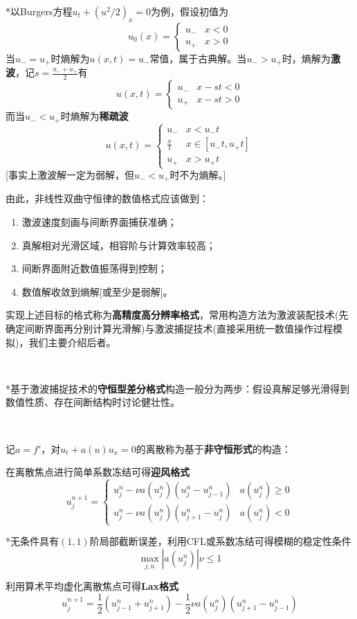 \documentclass[a4paper,UTF8,fontset=windows]{ctexart}
\begin{document}
*以Burgers方程$u_t+(u^2/2)_x=0$为例，假设初值为
$$u_0(x)=\begin{cases}u_-&x<0\\u_+&x>0\end{cases}$$
当$u_-=u_+$时熵解为$u(x,t)=u_-$常值，属于古典解。当$u_->u_+$时，熵解为\textbf{激波}，记$s=\frac{u_-+u_+}{2}$有
$$u(x,t)=\begin{cases}u_-&x-st<0\\u_+&x-st>0\end{cases}$$
而当$u_-<u_+$时熵解为\textbf{稀疏波}
$$u(x,t)=\begin{cases}u_-&x<u_-t\\\frac{x}{t}&x\in[u_-t,u_+t]\\u_+&x>u_+t\end{cases}$$
[事实上激波解一定为弱解，但$u_-<u_+$时不为熵解。]

由此，非线性双曲守恒律的数值格式应该做到：
\begin{enumerate}
    \item 激波速度刻画与间断界面捕获准确；
    \item 真解相对光滑区域，相容阶与计算效率较高；
    \item 间断界面附近数值振荡得到控制；
    \item 数值解收敛到熵解[或至少是弱解]。
\end{enumerate}
实现上述目标的格式称为\textbf{高精度高分辨率格式}，常用构造方法为激波装配技术(先确定间断界面再分别计算光滑解)与激波捕捉技术(直接采用统一数值操作过程模拟)，我们主要介绍后者。

\

*基于激波捕捉技术的\textbf{守恒型差分格式}构造一般分为两步：假设真解足够光滑得到数值性质、存在间断结构时讨论健壮性。

\

记$a=f'$，对$u_t+a(u)u_x=0$的离散称为基于\textbf{非守恒形式}的构造：

在离散焦点进行简单系数冻结可得\textbf{迎风格式}
$$u_j^{n+1}=\begin{cases}u_j^n-\nu a(u_j^n)(u_j^n-u_{j-1}^n)&a(u_j^n)\ge0\\u_j^n-\nu a(u_j^n)(u_{j+1}^n-u_j^n)&a(u_j^n)<0\end{cases}$$

*无条件具有$(1,1)$阶局部截断误差，利用CFL或系数冻结可得模糊的稳定性条件
$$\max_{j,n}|a(u_j^n)|\nu\le1$$

利用算术平均虚化离散焦点可得\textbf{Lax格式}
$$u_j^{n+1}=\frac{1}{2}(u_{j-1}^n+u_{j+1}^n)-\frac{1}{2}\nu a(u_j^n)(u_{j+1}^n-u_{j-1}^n)$$
\end{document}
